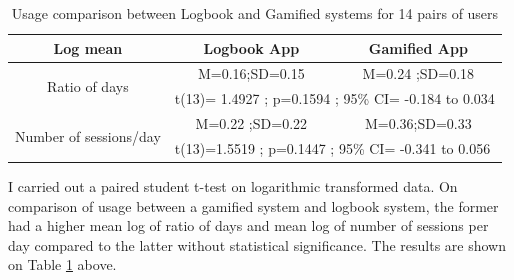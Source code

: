 \begin{table}[h!]

  \begin{center}
    \caption{Usage comparison between Logbook and Gamified systems for 14 pairs of users}
    \label{table:usagewellness1}
	\begin{tabular}{|c|c|c|}
		\hline
		Log mean &Logbook App&Gamified App\\
		\hline
		 \multirow{2}{*}{Ratio of days}&M=0.16;SD=0.15&M=0.24 ;SD=0.18\\\cline{2-3} 

		 &\multicolumn{2}{|l|}{t(13)= 1.4927 ; p=0.1594 ; 95\% CI= -0.184 to 0.034} \\
\hline
   		 \multirow{2}{*}{ Number of sessions/day}&M=0.22 ;SD=0.22&M=0.36;SD=0.33\\\cline{2-3} 
		
		 &\multicolumn{2}{|l|}{t(13)=1.5519 ; p=0.1447 ; 95\% CI= -0.341 to 0.056} \\
\hline

	\end{tabular}
  \end{center}
\end{table}
\newline  
 
I carried out a paired student t-test on logarithmic transformed data.  On comparison of usage between a gamified system and logbook system, the former had a higher mean log of ratio of days  and mean log of number of sessions per day compared to the latter without statistical significance.
The results are shown on Table \ref{table:usagewellness1} above.
 
